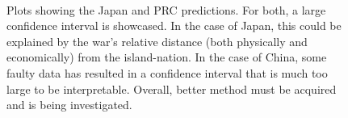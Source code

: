 \documentclass[11pt,regno]{amsart}
\theoremstyle{plain}
\numberwithin{equation}{section}
\begin{document}
\begin{figure}
\centering
\centerline{ \mbox{
}}
\caption{Plots showing the Japan and PRC predictions. For both, a large confidence interval is showcased. In the case of Japan, this could be explained by the war's relative distance (both physically and economically) from the island-nation. In the case of China, some faulty data has resulted in a confidence interval that is much too large to be interpretable. Overall, better method must be acquired and is being investigated.}
\end{figure}




\end{document}
